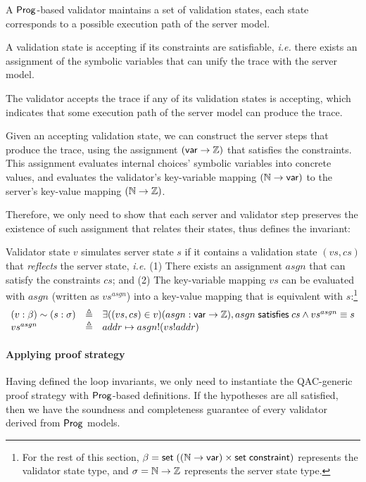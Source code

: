 A $\mathsf{Prog}$-based validator maintains a set of validation states, each state
corresponds to a possible execution path of the server model.

A validation state is accepting if its constraints are satisfiable, {\it i.e.}
there exists an assignment of the symbolic variables that can unify the trace
with the server model.

The validator accepts the trace if any of its validation states is accepting,
which indicates that some execution path of the server model can produce the
trace.

Given an accepting validation state, we can construct the server steps that
produce the trace, using the assignment $(\mathsf{var}\to\mathbb Z)$ that satisfies the
constraints.  This assignment evaluates internal choices' symbolic variables
into concrete values, and evaluates the validator's key-variable mapping
$(\mathbb N\to\mathsf{var})$ to the server's key-value mapping $(\mathbb N\to\mathbb Z)$.

Therefore, we only need to show that each server and validator step preserves
the existence of such assignment that relates their states, thus defines the
invariant:

\begin{definition}
  Validator state $v$ simulates server state $s$ if it contains a validation
  state $(vs,cs)$ that {\em reflects} the server state, {\it i.e.}  (1) There
  exists an assignment $asgn$ that can satisfy the constraints $cs$; and (2) The
  key-variable mapping $vs$ can be evaluated with $asgn$ (written as
  $vs^{asgn}$) into a key-value mapping that is equivalent with
  $s$:\footnote{For the rest of this section,
  $\beta=\mathsf{set}\;((\mathbb N\to\mathsf{var})\times\mathsf{set}\;\mathsf{constraint})$ represents the validator
  state type, and $\sigma=\mathbb N\to\mathbb Z$ represents the server state type.}
\[\begin{array}{lll} (v:\beta)\sim (s:\sigma)&\triangleq& \exists((vs,cs)\in
  v)(asgn:\mathsf{var}\to\mathbb Z),asgn\;\mathsf{satisfies}\;cs\wedge vs^{asgn}\equiv s\\
  vs^{asgn}&\triangleq&addr\mapsto asgn!(vs!addr) \end{array}\]
\end{definition}

\paragraph{Applying proof strategy}
Having defined the loop invariants, we only need to instantiate the QAC-generic
proof strategy with $\mathsf{Prog}$-based definitions.  If the hypotheses are all
satisfied, then we have the soundness and completeness guarantee of every
validator derived from $\mathsf{Prog}$ models.

